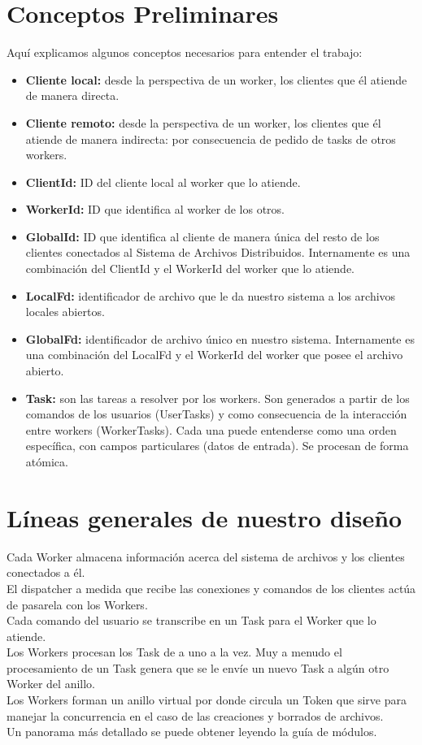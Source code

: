 \documentclass[12pt]{article}
\begin{document}
\section{Conceptos Preliminares}
Aquí explicamos algunos conceptos necesarios para entender el trabajo:
\begin{itemize}
\item \textbf{Cliente local:} desde la perspectiva de un worker, los clientes que él atiende de manera directa.
\item \textbf{Cliente remoto:} desde la perspectiva de un worker, los clientes que él atiende de manera indirecta: por consecuencia de pedido de tasks de otros workers.
\item \textbf{ClientId:} ID del cliente local al worker que lo atiende.
\item \textbf{WorkerId:} ID que identifica al worker de los otros.
\item \textbf{GlobalId:} ID que identifica al cliente de manera única del resto de los clientes conectados al Sistema de Archivos Distribuidos. Internamente es una combinación del ClientId y el WorkerId del worker que lo atiende.
\item \textbf{LocalFd:} identificador de archivo que le da nuestro sistema a los archivos locales abiertos.
\item \textbf{GlobalFd:} identificador de archivo único en nuestro sistema. Internamente es una combinación del LocalFd y el WorkerId del worker que posee el archivo abierto.
\item \textbf{Task:} son las tareas a resolver por los workers. Son generados a partir de los comandos de los usuarios (UserTasks) y como consecuencia de la interacción entre workers (WorkerTasks). Cada una puede entenderse como una orden específica, con campos particulares (datos de entrada). Se procesan de forma atómica.
\end{itemize}

\section{Líneas generales de nuestro diseño}
Cada Worker almacena información acerca del sistema de archivos y los clientes conectados a él.\\
El dispatcher a medida que recibe las conexiones y comandos de los clientes actúa de pasarela con los Workers.\\
Cada comando del usuario se transcribe en un Task para el Worker que lo atiende.\\
Los Workers procesan los Task de a uno a la vez. Muy a menudo el procesamiento de un Task genera que se le envíe un nuevo Task a algún otro Worker del anillo.\\
Los Workers forman un anillo virtual por donde circula un Token que sirve para manejar la concurrencia en el caso de las creaciones y borrados de archivos.\\
Un panorama más detallado se puede obtener leyendo la guía de módulos.\\
\end{document}

